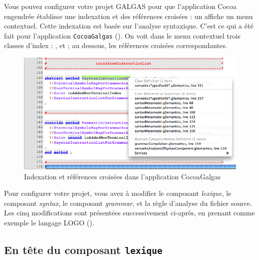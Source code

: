 
Vous pouvez configurer votre projet GALGAS pour que l'application Cocoa engendrée établisse une indexation et des références croisées : un  affiche un menu contextuel. Cette indexation est basée sur l'analyse syntaxique. C'est ce qui a été fait pour l'application \texttt{CocoaGalgas} (). On voit dans le menu contextuel trois classes d'index : ,  et  ; au dessous, les références croisées correspondantes.



\begin{figure}[t]
  \centering
  \includegraphics[width=16cm]{chapter-cocoa-features/indexing-sample.png}
  \caption{Indexation et références croisées dans l'application CocoaGalgas}
  \ligne
\end{figure}

Pour configurer votre projet, vous avez à modifier le composant \emph{lexique}, le composant \emph{syntax}, le composant \emph{grammar}, et la règle d'analyse du fichier source. Les cinq modifications sont présentées successivement ci-après, en prenant comme exemple le langage LOGO ().





\subsection{En tête du composant \texttt{lexique}}

